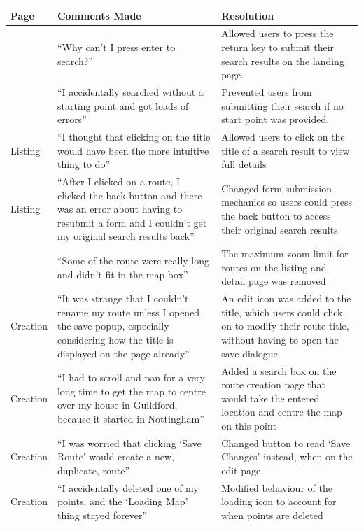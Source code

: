 \begin{tabular}{p{1.5cm}|p{6.25cm}|p{6.25cm}}
	\hline 
	\textbf{Page} & \textbf{Comments Made} & \textbf{Resolution} \\
	\hline 
	\lbrcell{Landing} & ``Why can't I press enter to search?'' & Allowed users to press the return key to submit their search results on the landing page.\\
	\hline
	\lbrcell{Landing} & ``I accidentally searched without a starting point and got loads of errors'' & Prevented users from submitting their search if no start point was provided.\\
	\hline	
	Listing & ``I thought that clicking on the title would have been the more intuitive thing to do'' & Allowed users to click on the title of a search result to view full details\\
	\hline	
	Listing & ``After I clicked on a route, I clicked the back button and there was an error about having to resubmit a form and I couldn't get my original search results back'' & Changed form submission mechanics so users could press the back button to access their original search results\\
		\hline
		\lbrcell{Listing} & ``Some of the route were really long and didn't fit in the map box'' & The maximum zoom limit for routes on the listing and detail page was removed\\
	\hline		
	Creation & ``It was strange that I couldn't rename my route unless I opened the save popup, especially considering how the title is displayed on the page already'' & An edit icon was added to the title, which users could click on to modify their route title, without having to open the save dialogue.\\
	\hline
	Creation & ``I had to scroll and pan for a very long time to get the map to centre over my house in Guildford, because it started in Nottingham'' & Added a search box on the route creation page that would take the entered location and centre the map on this point\\ 
	\hline
	Creation & ``I was worried that clicking `Save Route' would create a new, duplicate, route'' & Changed button to read `Save Changes' instead, when on the edit page. \\
	\hline
	Creation & ``I accidentally deleted one of my points, and the `Loading Map' thing stayed forever'' & Modified behaviour of the loading icon to account for when points are deleted\\
		\hline
\end{tabular}


	